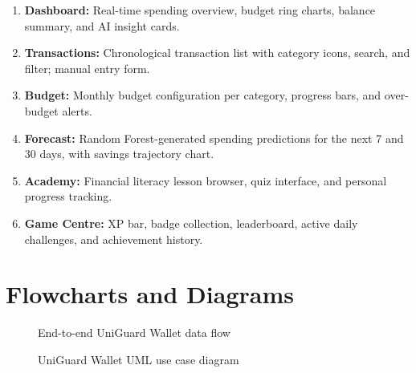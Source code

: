 \documentclass[12pt]{report}
\begin{document}
\begin{enumerate}
    \item \textbf{Dashboard:} Real-time spending overview, budget ring charts, balance summary, and AI insight cards.
    \item \textbf{Transactions:} Chronological transaction list with category icons, search, and filter; manual entry form.
    \item \textbf{Budget:} Monthly budget configuration per category, progress bars, and over-budget alerts.
    \item \textbf{Forecast:} Random Forest-generated spending predictions for the next 7 and 30 days, with savings trajectory chart.
    \item \textbf{Academy:} Financial literacy lesson browser, quiz interface, and personal progress tracking.
    \item \textbf{Game Centre:} XP bar, badge collection, leaderboard, active daily challenges, and achievement history.
\end{enumerate}

\section{Flowcharts and Diagrams}

\begin{figure}[H]
\centering
{}
\caption{End-to-end UniGuard Wallet data flow}
\label{fig:dataflow}
\end{figure}

\begin{figure}[H]
\centering
{}
\caption{UniGuard Wallet UML use case diagram}
\label{fig:usecase}
\end{figure}
\end{document}
